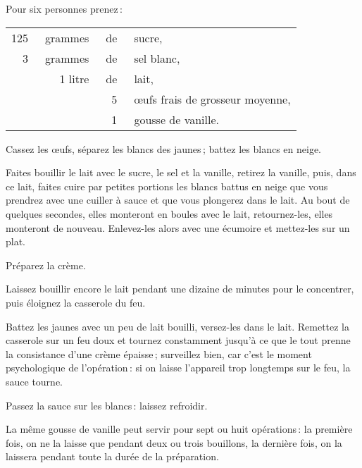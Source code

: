 Pour six personnes prenez :

\footnotesize
\begin{longtable}{rrrp{16em}}
    125 & grammes & de & sucre,                                                                           \\
      3 & grammes & de & sel blanc,                                                                       \\
        & 1 litre & de & lait,                                                                            \\
        &         &  5 & œufs frais de grosseur moyenne,                                                  \\
        &         &  1 & gousse de vanille.                                                               \\
\end{longtable}
\normalsize

Cassez les œufs, séparez les blancs des jaunes ; battez les blancs en neige.

Faites bouillir le lait avec le sucre, le sel et la vanille, retirez la
vanille, puis, dans ce lait, faites cuire par petites portions les blancs
battus en neige que vous prendrez avec une cuiller à sauce et que vous
plongerez dans le lait. Au bout de quelques secondes, elles monteront en boules
avec le lait, retournez-les, elles monteront de nouveau. Enlevez-les alors avec
une écumoire et mettez-les sur un plat.

\label{pg0868} \hypertarget{p0868}{}
Préparez la crème.

Laissez bouillir encore le lait pendant une dizaine de minutes pour le
concentrer, puis éloignez la casserole du feu.

Battez les jaunes avec un peu de lait bouilli, versez-les dans le lait.
Remettez la casserole sur un feu doux et tournez constamment jusqu'à ce que le
tout prenne la consistance d’une crème épaisse ; surveillez bien, car c'est le
moment psychologique de l'opération : si on laisse l'appareil trop longtemps
sur le feu, la sauce tourne.

Passez la sauce sur les blancs : laissez refroidir.

La même gousse de vanille peut servir pour sept ou huit opérations : la
première fois, on ne la laisse que pendant deux ou trois bouillons, la dernière
fois, on la laissera pendant toute la durée de la préparation.

\sk

